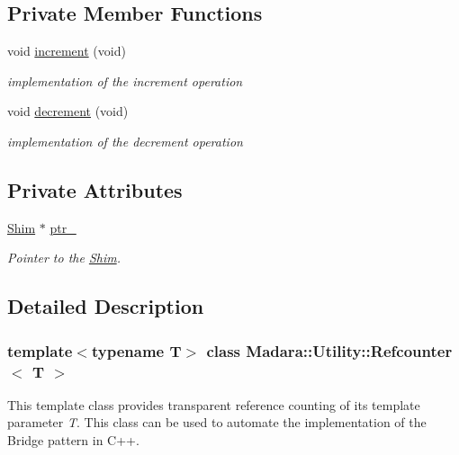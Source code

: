 \subsection*{Private Member Functions}
\begin{DoxyCompactItemize}
\item 
void \hyperlink{classMadara_1_1Utility_1_1Refcounter_aa437e6df8c6fc20e10b1ba26e5cae180}{increment} (void)
\begin{DoxyCompactList}\small\item\em implementation of the increment operation \item\end{DoxyCompactList}\item 
void \hyperlink{classMadara_1_1Utility_1_1Refcounter_a12bac88a73bcdfdeb5b83fb59d4c51d0}{decrement} (void)
\begin{DoxyCompactList}\small\item\em implementation of the decrement operation \item\end{DoxyCompactList}\end{DoxyCompactItemize}
\subsection*{Private Attributes}
\begin{DoxyCompactItemize}
\item 
\hyperlink{structMadara_1_1Utility_1_1Refcounter_1_1Shim}{Shim} $\ast$ \hyperlink{classMadara_1_1Utility_1_1Refcounter_a0840e75dea9c1332af0a2bc945c13b75}{ptr\_\-}
\begin{DoxyCompactList}\small\item\em Pointer to the {\itshape \hyperlink{structMadara_1_1Utility_1_1Refcounter_1_1Shim}{Shim}\/}. \item\end{DoxyCompactList}\end{DoxyCompactItemize}


\subsection{Detailed Description}
\subsubsection*{template$<$typename T$>$ class Madara::Utility::Refcounter$<$ T $>$}

This template class provides transparent reference counting of its template parameter {\itshape T\/}. This class can be used to automate the implementation of the Bridge pattern in C++. 

